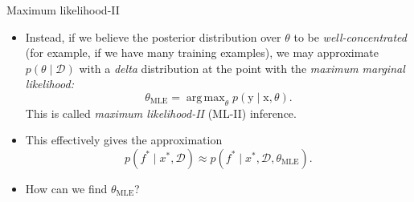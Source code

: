 \documentclass[xcolor={dvipsnames},hyperref={breaklinks=true},12pt]{beamer}
\newcommand{\given}{\mid}
\newcommand{\mc}[1]{\mathcal{#1}}
\newcommand{\data}{\mc{D}}
\renewcommand{\vec}[1]{\bm{\mathrm{#1}}}
\newcommand{\emphr}[1]{{\textcolor{or}{\itshape #1}}}
\DeclareMathOperator*{\argmax}{arg\,max}
\begin{document}
\begin{frame}{Maximum likelihood-II}
  \begin{itemize}
    \item Instead, if we believe the posterior distribution over
      $\theta$ to be \emphr{well-concentrated} (for example, if we
      have many training examples), we may approximate $p(\theta
      \given \data)$ with a \emphr{delta} distribution at the point
      with the \emphr{maximum marginal likelihood:}
      \begin{equation*}
        \theta_{\text{MLE}}
        =
        \argmax_\theta p(\vec{y} \given \vec{x}, \theta).
      \end{equation*}
      This is called \emphr{maximum likelihood-II} (ML-II) inference.
    \item
      This effectively gives the approximation
      \begin{equation*}
        p(f^\ast \given x^\ast, \data)
        \approx
        p(f^\ast \given x^\ast, \data, \theta_{\text{MLE}}).
      \end{equation*}
    \item
      How can we find $\theta_{\text{MLE}}$?
  \end{itemize}
\end{frame}
\end{document}
